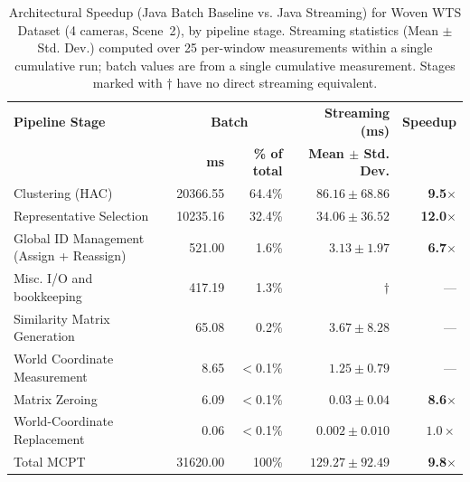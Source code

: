 \documentclass[review]{elsarticle}
\begin{document}
\begin{table}[H]
    \centering
    \caption{Architectural Speedup (Java Batch Baseline vs. Java Streaming) for Woven WTS
    Dataset (4 cameras, Scene~2), by pipeline stage. Streaming statistics (Mean $\pm$ Std.
    Dev.) computed over 25 per-window measurements within a single cumulative run; batch
    values are from a single cumulative measurement. Stages marked with $\dagger$
    have no direct streaming equivalent.}
    \label{tab:performance_combined}
    \small
    \begin{tabular}{@{}l|rr|rr@{}}
        \toprule
        \textbf{Pipeline Stage} & \multicolumn{2}{c|}{\textbf{Batch}} & \textbf{Streaming (ms)} & \textbf{Speedup} \\
        & \textbf{ms} & \textbf{\% of total} & \textbf{Mean $\pm$ Std. Dev.} & \\ \midrule
        Clustering (HAC) & 20366.55 & 64.4\% & $86.16 \pm 68.86$ & \textbf{9.5$\times$} \\
        Representative Selection & 10235.16 & 32.4\% & $34.06 \pm 36.52$ & \textbf{12.0$\times$} \\
        Global ID Management (Assign + Reassign) & 521.00 & 1.6\% & $3.13 \pm 1.97$ & \textbf{6.7$\times$} \\
        Misc. I/O and bookkeeping & 417.19 & 1.3\% & $\dagger$ & --- \\
        Similarity Matrix Generation & 65.08 & 0.2\% & $3.67 \pm 8.28$ & --- \\
        World Coordinate Measurement & 8.65 & $<$0.1\% & $1.25 \pm 0.79$ & --- \\
        Matrix Zeroing & 6.09 & $<$0.1\% & $0.03 \pm 0.04$ & \textbf{8.6$\times$} \\
        World-Coordinate Replacement & 0.06 & $<$0.1\% & $0.002 \pm 0.010$ & $1.0\times$ \\
        \midrule
        Total MCPT & 31620.00 & 100\% & $129.27 \pm 92.49$ & \textbf{9.8$\times$} \\
        \bottomrule
    \end{tabular}
\end{table}
\end{document}
